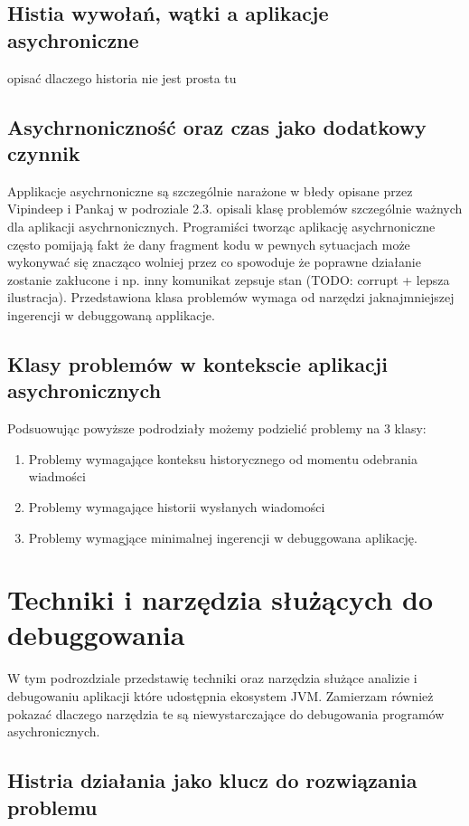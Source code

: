 \subsection{Histia wywołań, wątki a aplikacje asychroniczne}

opisać dlaczego historia nie jest prosta tu

\subsection{Asychrnoniczność oraz czas jako dodatkowy czynnik}

Applikacje asychrnoniczne są szczególnie narażone w błedy opisane przez Vipindeep i Pankaj w podroziale 2.3. opisali klasę problemów szczególnie ważnych dla aplikacji asychrnonicznych. Programiści tworząc aplikację asychrnoniczne często pomijają fakt że dany fragment kodu w pewnych sytuacjach może wykonywać się znacząco wolniej przez co spowoduje że poprawne działanie zostanie zakłucone i np. inny komunikat zepsuje stan (TODO: corrupt + lepsza ilustracja). Przedstawiona klasa problemów wymaga od narzędzi jaknajmniejszej ingerencji w debuggowaną applikacje. 

\subsection{Klasy problemów w kontekscie aplikacji asychronicznych}

Podsuowując powyższe podrodziały możemy podzielić problemy na 3 klasy:
\begin{enumerate}
\item Problemy wymagające konteksu historycznego od momentu odebrania wiadmości
\item Problemy wymagające historii wysłanych wiadomości
\item Problemy wymagjące minimalnej ingerencji w debuggowana aplikację. 
\end{enumerate} 

\section{Techniki i narzędzia służących do debuggowania}

W tym podrozdziale przedstawię techniki oraz narzędzia służące analizie i debugowaniu aplikacji które udostępnia ekosystem JVM. Zamierzam również pokazać dlaczego narzędzia te są niewystarczające do debugowania programów asychronicznych.

\subsection{Histria działania jako klucz do rozwiązania problemu}

